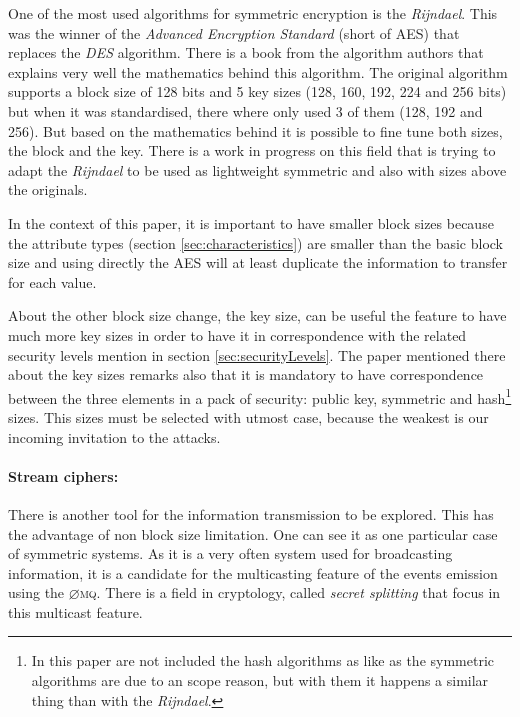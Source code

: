 \documentclass[10pt,a4paper,twoside]{llncs}
\newcommand{\zmq}{\textsc{$\varnothing$mq}}
\begin{document}
One of the most used algorithms for symmetric encryption is the \emph{Rijndael}. This was the winner of the \emph{Advanced Encryption Standard} (short of AES) \cite{AES-FIPS} that replaces the \emph{DES} algorithm. There is a book \cite{Daemen:2002:DR:560131} from the algorithm authors that explains very well the mathematics behind this algorithm. The original algorithm supports a block size of 128 bits and 5 key sizes (128, 160, 192, 224 and 256 bits) but when it was standardised, there where only used 3 of them (128, 192 and 256). But based on the mathematics behind it is possible to fine tune both sizes, the block and the key. There is a work in progress on this field \cite{gRijndael} that is trying to adapt the \emph{Rijndael} to be used as lightweight symmetric and also with sizes above the originals.

In the context of this paper, it is important to have smaller block sizes because the attribute types (section \ref{sec:characteristics}) are smaller than the basic block size and using directly the AES will at least duplicate the information to transfer for each value.

About the other block size change, the key size, can be useful the feature to have much more key sizes in order to have it in correspondence with the related security levels mention in section \ref{sec:securityLevels}. The paper mentioned there \cite{lenstrauniversal13} about the key sizes remarks also that it is mandatory to have correspondence between the three elements in a pack of security: public key, symmetric and hash\footnote{In this paper are not included the hash algorithms as like as the symmetric algorithms are due to an scope reason, but with them it happens a similar thing than with the \emph{Rijndael}.} sizes. This sizes must be selected with utmost case, because the weakest is our incoming invitation to the attacks.

\paragraph{Stream ciphers:} There is another tool for the information transmission to be explored. This has the advantage of non block size limitation. One can see it as one particular case of symmetric systems. As it is a very often system used for broadcasting information, it is a candidate for the multicasting feature of the events emission using the \zmq. There is a field in cryptology, called \emph{secret splitting} that focus in this multicast feature.
\end{document}
